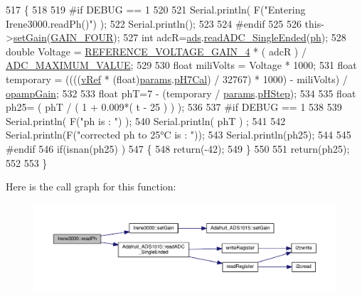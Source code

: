 \begin{DoxyCode}
517 \{
518 
519 \textcolor{preprocessor}{#if DEBUG == 1 }
520 
521     Serial.println( F(\textcolor{stringliteral}{"Entering Irene3000.readPh()"}) );
522     Serial.println();
523 
524 \textcolor{preprocessor}{#endif }
525 
526     this->\hyperlink{class_irene3000_aff7c5da186b388e7272e63ff88a20c34}{setGain}(\hyperlink{_cool_adafruit___a_d_s1015_8h_a3d6c0e15829a207b9155890811fa4781a33fa5521f4e806b7438052fcdbbf8660}{GAIN\_FOUR});
527     \textcolor{keywordtype}{int} adcR=\hyperlink{class_irene3000_a1215e77ba761c9908d80d691f149e135}{ads}.\hyperlink{class_adafruit___a_d_s1015_a40f38b9e1f3ec397c0670dd632510235}{readADC\_SingleEnded}(\hyperlink{_irene3000_8h_af771ceafe0e6524dd8497d4305dfe778}{ph});
528     \textcolor{keywordtype}{double} Voltage =  \hyperlink{_irene3000_8h_a51af1d267f8d2e05eff1e4f5c88d02e5}{REFERENCE\_VOLTAGE\_GAIN\_4} * ( adcR ) / 
      \hyperlink{_irene3000_8h_ae04444a85a37b5dce09107f2ce2b2c80}{ADC\_MAXIMUM\_VALUE};
529 
530     \textcolor{keywordtype}{float} miliVolts = Voltage * 1000;
531     \textcolor{keywordtype}{float} temporary = ((((\hyperlink{class_irene3000_a018e7ff9bee57e6d2b298667a668ba7e}{vRef} * (float)\hyperlink{class_irene3000_a136585a5ee7f9ac6ab52175fa153f8e3}{params}.\hyperlink{struct_irene3000_1_1parameters___t_a21265466a570d84bff914f26d2f7a03e}{pH7Cal}) / 32767) * 1000) - miliVolts) / 
      \hyperlink{class_irene3000_a4e588985ca74e5076029d5dee81034f2}{opampGain};
532     
533     \textcolor{keywordtype}{float} phT=7 - (temporary / \hyperlink{class_irene3000_a136585a5ee7f9ac6ab52175fa153f8e3}{params}.\hyperlink{struct_irene3000_1_1parameters___t_a61cfcc2539d5f630e9071f3753aba9fe}{pHStep});
534 
535     \textcolor{keywordtype}{float} ph25= ( phT / ( 1 + 0.009*( t - 25 ) ) );
536 
537 \textcolor{preprocessor}{#if DEBUG == 1 }
538 
539     Serial.println( F(\textcolor{stringliteral}{"ph is : "}) );
540     Serial.println( phT ) ;
541     
542     Serial.println(F(\textcolor{stringliteral}{"corrected ph to 25°C is : "}));
543     Serial.println(ph25);
544 
545 \textcolor{preprocessor}{#endif }
546     \textcolor{keywordflow}{if}(isnan(ph25) )
547     \{
548         \textcolor{keywordflow}{return}(-42);    
549     \}
550 
551     \textcolor{keywordflow}{return}(ph25);
552 
553 \}
\end{DoxyCode}
Here is the call graph for this function\+:\nopagebreak
\begin{figure}[H]
\begin{center}
\leavevmode
\includegraphics[width=350pt]{d6/d03/class_irene3000_a436fc0a06681cd0784aba56b9707f19a_cgraph}
\end{center}
\end{figure}
